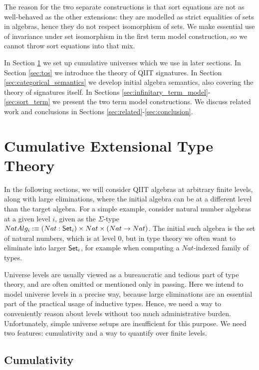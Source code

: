 \documentclass{llncs}
\begin{document}
The reason for the two separate constructions is that sort equations are not as
well-behaved as the other extensions: they are modelled as strict equalities of
sets in algebras, hence they do not respect isomorphism of sets. We make
essential use of invariance under set isomorphism in the first term model
construction, so we cannot throw sort equations into that mix.

In Section \ref{sec:levels} we set up cumulative universes which we use in later
sections. In Section \ref{sec:tos} we introduce the theory of QIIT
signatures. In Section \ref{sec:categorical_semantics} we develop initial algebra semantics,
also covering the theory of signatures itself. In Sections
\ref{sec:infinitary_term_model}-\ref{sec:sort_term} we present the two term model
constructions. We discuss related work and conclusions in Sections
\ref{sec:related}-\ref{sec:conclusion}.


\section{Cumulative Extensional Type Theory}
\label{sec:levels}

In the following sections, we will consider QIIT algebras at arbitrary finite
levels, along with large eliminations, where the initial algebra can be at a
different level than the target algebra. For a simple example, consider natural
number algebras at a given level $i$, given as the $\Sigma$-type $NatAlg_i :\equiv(Nat :
\mathsf{Set}_i)\times Nat\times(Nat \rightarrow Nat)$. The initial such algebra is the set of
natural numbers, which is at level $0$, but in type theory we often want to
eliminate into larger $\mathsf{Set}_i$, for example when computing a $Nat$-indexed family
of types.

Universe levels are usually viewed as a bureaucratic and tedious part of type
theory, and are often omitted or mentioned only in passing. Here we intend to
model universe levels in a precise way, because large eliminations are an
essential part of the practical usage of inductive types. Hence, we need a way
to conveniently reason about levels without too much administrative
burden. Unfortunately, simple universe setups are insufficient for this
purpose. We need two features: cumulativity and a way to quantify over finite
levels.

\subsection{Cumulativity}
\end{document}
